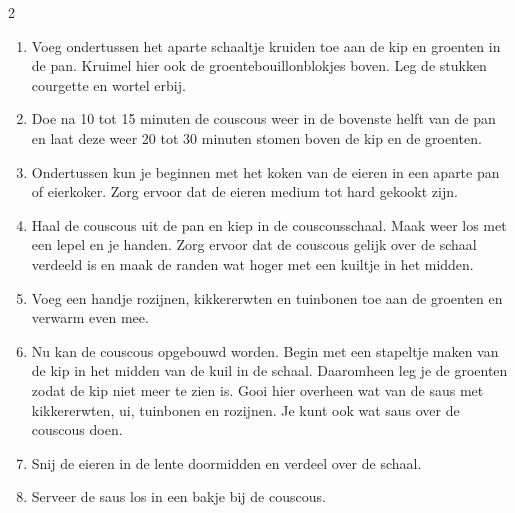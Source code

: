 \begin{paracol}{2}
\begin{enumerate}
    \item Voeg ondertussen het aparte schaaltje kruiden toe aan de kip en groenten in de pan. Kruimel hier ook de groentebouillonblokjes boven. Leg de stukken courgette en wortel erbij.
    \item Doe na 10 tot 15 minuten de couscous weer in de bovenste helft van de pan en laat deze weer 20 tot 30 minuten stomen boven de kip en de groenten.
    \item Ondertussen kun je beginnen met het koken van de eieren in een aparte pan of eierkoker. Zorg ervoor dat de eieren medium tot hard gekookt zijn.
    \item Haal de couscous uit de pan en kiep in de couscousschaal. Maak weer los met een lepel en je handen. Zorg ervoor dat de couscous gelijk over de schaal verdeeld is en maak de randen wat hoger met een kuiltje in het midden.
    \item Voeg een handje rozijnen, kikkererwten en tuinbonen toe aan de groenten en verwarm even mee.
    \item Nu kan de couscous opgebouwd worden. Begin met een stapeltje maken van de kip in het midden van de kuil in de schaal. Daaromheen leg je de groenten zodat de kip niet meer te zien is. Gooi hier overheen wat van de saus met kikkererwten, ui, tuinbonen en rozijnen. Je kunt ook wat saus over de couscous doen.
    \item Snij de eieren in de lente doormidden en verdeel over de schaal.
    \item Serveer de saus los in een bakje bij de couscous.
\end{enumerate}

\end{paracol}
